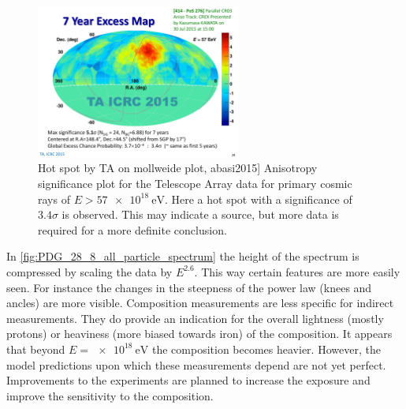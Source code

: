 \begin{figure}
    \centering
    \includegraphics[width=0.6\textwidth]
                    {plots/cosmic-rays/hotspot_ta}
    \caption{Hot spot by TA on mollweide plot, abasi2015]
Anisotropy significance plot for the Telescope Array data for primary cosmic rays of $E > \SI{57e18}{\eV}$. Here a hot spot with a significance of $3.4 \sigma$ is observed. This may indicate a source, but more data is required for a more definite conclusion.}
    \label{fig:hotspot_ta}
\end{figure}

In \cref{fig:PDG_28_8_all_particle_spectrum} the height of the spectrum is compressed by scaling the data by $E^{2.6}$. This way certain features are more easily seen. For instance the changes in the steepness of the power law (knees and ancles) are more visible. Composition measurements are less specific for indirect measurements. They do provide an indication for the overall lightness (mostly protons) or heaviness (more biased towards iron) of the composition. It appears that beyond $E = \SI{e18}{\eV}$ the composition becomes heavier. However, the model predictions upon which these measurements depend are not yet perfect. Improvements to the experiments are planned to increase the exposure and improve the sensitivity to the composition.

